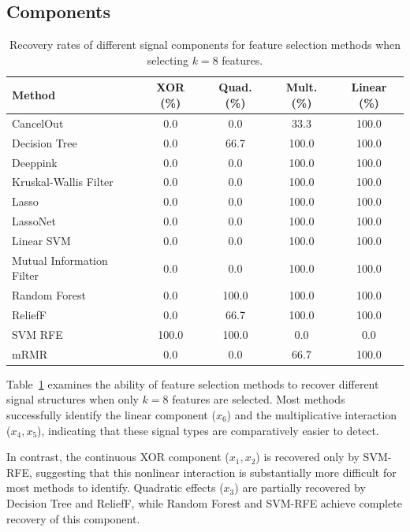 \subsection{Components}

\begin{table}[h]
\centering
\begin{tabular}{lcccc}
\hline
Method & XOR (\%) & Quad. (\%) & Mult. (\%) & Linear (\%) \\
\hline
CancelOut                  & 0.0   & 0.0   & 33.3  & 100.0 \\
Decision Tree              & 0.0   & 66.7  & 100.0 & 100.0 \\
Deeppink                   & 0.0   & 0.0   & 100.0 & 100.0 \\
Kruskal-Wallis Filter      & 0.0   & 0.0   & 100.0 & 100.0 \\
Lasso                      & 0.0   & 0.0   & 100.0 & 100.0 \\
LassoNet                   & 0.0   & 0.0   & 100.0 & 100.0 \\
Linear SVM                 & 0.0   & 0.0   & 100.0 & 100.0 \\
Mutual Information Filter  & 0.0   & 0.0   & 100.0 & 100.0 \\
Random Forest              & 0.0   & 100.0 & 100.0 & 100.0 \\
ReliefF                    & 0.0   & 66.7  & 100.0 & 100.0 \\
SVM RFE                    & 100.0 & 100.0 & 0.0   & 0.0 \\
mRMR                       & 0.0   & 0.0   & 66.7  & 100.0 \\
\hline
\end{tabular}
\caption{Recovery rates of different signal components for feature selection methods when selecting $k = 8$ features.}
\label{tab:signal_component_recovery}
\end{table}

Table~\ref{tab:signal_component_recovery} examines the ability of feature selection methods to recover different signal structures when only $k = 8$ features are selected. Most methods successfully identify the linear component ($x_6$) and the multiplicative interaction ($x_4, x_5$), indicating that these signal types are comparatively easier to detect.

In contrast, the continuous XOR component ($x_1, x_2$) is recovered only by SVM-RFE, suggesting that this nonlinear interaction is substantially more difficult for most methods to identify. Quadratic effects ($x_3$) are partially recovered by Decision Tree and ReliefF, while Random Forest and SVM-RFE achieve complete recovery of this component.

